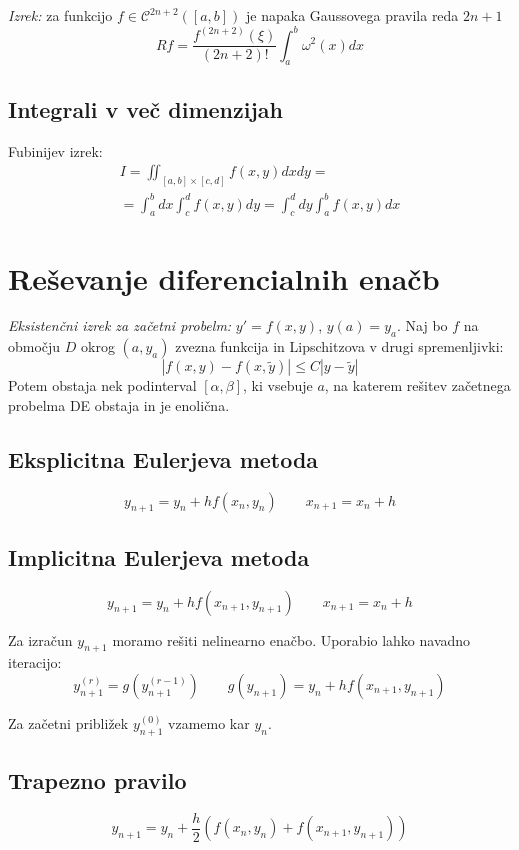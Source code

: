 \begin{multicols}{5}
\textit{Izrek:} za funkcijo $f \in \mathcal{C}^{2n+2}([a,b])$ je napaka Gaussovega pravila reda $2n+1$
\[ Rf = \frac{f^{(2n+2)}(\xi)}{(2n+2)!} \int_a^b \omega^2(x) dx \]

\subsection*{Integrali v več dimenzijah}
Fubinijev izrek:
\begin{multline*}
    I = \iint_{[a,b]\times [c,d]} f(x, y) dx dy = \\ 
    = \int_a^b dx \int_c^d f(x,y) dy = \int_c^d dy \int_a^b f(x, y) dx
\end{multline*}


\section*{Reševanje diferencialnih enačb}


\textit{Eksistenčni izrek za začetni probelm:} $y' = f(x,y)$, $y(a) = y_a$. Naj bo $f$
na območju $D$ okrog $(a, y_a)$ zvezna funkcija in Lipschitzova v drugi spremenljivki:
\[ |f(x,y) - f(x, \tilde{y}) | \leq C |y-\tilde{y}| \]
Potem obstaja nek podinterval $[\alpha, \beta]$, ki vsebuje $a$, na katerem rešitev
začetnega probelma DE obstaja in je enolična.
%

\subsection*{Eksplicitna Eulerjeva metoda}
\[ y_{n+1} = y_n + h f(x_n, y_n) \qquad x_{n+1} = x_n + h\]

\subsection*{Implicitna Eulerjeva metoda}
\[ y_{n+1} = y_n + hf(x_{n+1}, y_{n+1}) \qquad x_{n+1} = x_n + h\]

Za izračun $y_{n+1}$ moramo rešiti nelinearno enačbo. Uporabio lahko navadno iteracijo:
\[ y_{n+1}^{(r)} = g(y_{n+1}^{(r-1)}) \qquad g(y_{n+1}) = y_n + hf(x_{n+1}, y_{n+1}) \]

Za začetni približek $y_{n+1}^{(0)}$ vzamemo kar $y_n$.

\subsection*{Trapezno pravilo}
\[ y_{n+1} = y_n + \frac{h}{2}\left(f(x_n, y_n) + f(x_{n+1}, y_{n+1})\right)\]


\end{multicols}

